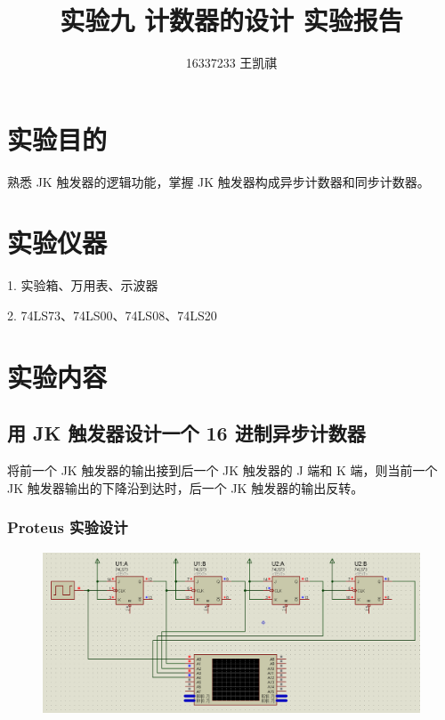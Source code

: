\documentclass{article}
\begin{document}
\title{实验九 \text{ } 计数器的设计 \text{ } 实验报告}
\author {16337233 王凯祺}
\maketitle

\section{实验目的}

熟悉 JK 触发器的逻辑功能，掌握 JK 触发器构成异步计数器和同步计数器。

\section{实验仪器}

1. 实验箱、万用表、示波器

2. 74LS73、74LS00、74LS08、74LS20

\section{实验内容}

\subsection{用 JK 触发器设计一个 16 进制异步计数器}

将前一个 JK 触发器的输出接到后一个 JK 触发器的 J 端和 K 端，则当前一个 JK 触发器输出的下降沿到达时，后一个 JK 触发器的输出反转。

\subsubsection{Proteus 实验设计}

\begin{figure}[!hbp]
  \centering
  \includegraphics[scale=0.3]{1/1.png}
\end{figure}
\end{document}
